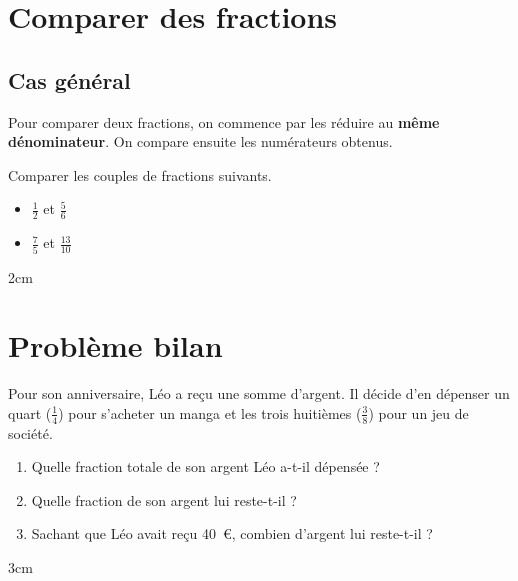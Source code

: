 \documentclass[a4paper]{book}
\begin{document}
    
\section{Comparer des fractions}
\subsection{Cas général}
    
    \begin{propriete}
        Pour comparer deux fractions, on commence par les réduire au \textbf{même dénominateur}. On compare ensuite les numérateurs obtenus.
    \end{propriete}
    
    
    \begin{exemple}
        Comparer les couples de fractions suivants.
        \begin{itemize}
            \item $\frac{1}{2}$ et $\frac{5}{6}$
            \item $\frac{7}{5}$ et $\frac{13}{10}$
        \end{itemize}

        \begin{ZoneReponse} {2cm}
        \end{ZoneReponse}
    \end{exemple}


\section{Problème bilan}

    Pour son anniversaire, Léo a reçu une somme d'argent. Il décide d'en dépenser un quart ($\frac{1}{4}$) pour s'acheter un manga et les trois huitièmes ($\frac{3}{8}$) pour un jeu de société. 
    
    \begin{enumerate}
        \item Quelle fraction totale de son argent Léo a-t-il dépensée ?
        \item Quelle fraction de son argent lui reste-t-il ?
        \item Sachant que Léo avait reçu 40~\textup{€}, combien d'argent lui reste-t-il ?
    \end{enumerate}


    \begin{ZoneReponse} {3cm}
    \end{ZoneReponse}
\end{document}

